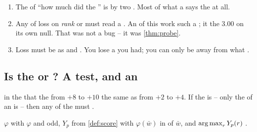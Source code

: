\begin{corollary}
\label{cor:probe3}
\begin{enumerate}
\item The  of ``how much   did the 
      '' is  by two . Most of what a  says 
       the   at all.
\item Any  of loss  on \emph{rank} or \emph{} must read a
      . An   of this work  such a ; it 
      the  $3.00$ on    its own null. That was not a bug
      -- it was \cref{thm:probe}.
\item Loss must be  as \emph{} and \emph{}. You  lose
      a  you  had; you can only be  away from what 
      .
\end{enumerate}
\end{corollary}

\subsection{Is the    or ? A test, and an }
\label{sec:cardinal}

 in the   that the  from $+8$ to $+10$ 
the same as from $+2$ to $+4$. If the  is  \emph{} -- only the
 of   an  is  -- then any 
  of the  must    .

\begin{protocol}
 $\varphi$ with $\varphi$   and odd, 
$Y_p$ from \cref{def:score} with $\varphi(\bar w)$ in  of $\bar w$, and
  $\operatorname*{arg\,max}_r Y_p(r)$ .
\end{protocol}

